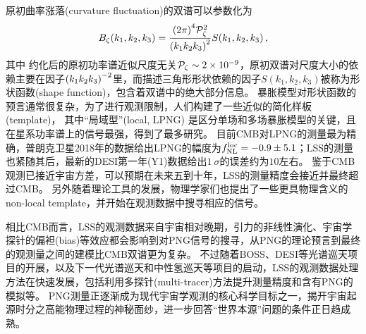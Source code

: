 原初曲率涨落(curvature fluctuation)的双谱可以参数化为
\begin{equation}
    B_{\zeta}(k_1,k_2,k_3) = \frac{{(2\pi)}^4 \mathcal{P}_{\zeta}^2}{{\qty(k_1 k_2 k_3)}^2}  S(k_1,k_2,k_3)\,,
\end{equation}
其中
约化后的原初功率谱近似尺度无关$\mathcal{P}_{\zeta}\sim 2\times 10^{-9}$，原初双谱对尺度大小的依赖主要在因子${\qty(k_1 k_2 k_3)}^{-2}$里，而描述三角形形状依赖的因子$S(k_1,k_2,k_3)$被称为形状函数(shape function)，包含着双谱中的绝大部分信息。
暴胀模型对形状函数的预言通常很复杂，为了进行观测限制，人们构建了一些近似的简化样板(template)，%
其中“局域型”(local, LPNG)%
是区分单场和多场暴胀模型的关键，且在星系功率谱上的信号最强，得到了最多研究\cite{dalal2008bk,ross2013bosspng,putter2017bk,karagiannis2018png,ferraro2019spec,planck2020png,cagliari2023ebosspng,chaussidon2024desipng}。
目前CMB对LPNG的测量最为精确，普朗克卫星2018年的数据给出LPNG的幅度为$f_{\rm NL}^{\rm loc}=-0.9\pm 5.1$\cite{planck2020png}；LSS的测量也紧随其后，最新的DESI第一年(Y1)数据给出$1~\sigma$的误差约为$10$左右\cite{chaussidon2024desipng}。
鉴于CMB观测已接近宇宙方差\cite{babich2004pbscmb,sefusatti2007pngb2}，可以预期在未来五到十年，LSS的测量精度会接近并最终超过CMB\cite{achucarro2022inflation,zhao2024must}。
另外随着理论工具的发展，物理学家们也提出了一些更具物理含义的non-local template，并开始在观测数据中搜寻相应的信号\cite{sohn2024CCCMB,cabass2024boss,green2024boss}。

相比CMB而言，LSS的观测数据来自宇宙相对晚期，引力的非线性演化、宇宙学探针的偏袒(bias)等效应都会影响到对PNG信号的搜寻，从PNG的理论预言到最终的观测量之间的建模比CMB双谱更为复杂。
不过随着BOSS、DESI等光谱巡天项目的开展，以及下一代光谱巡天和中性氢巡天等项目的启动，LSS的观测数据处理方法在快速发展，包括利用多探针(multi-tracer)方法提升测量精度\cite{barreira2023mtpng,sullivan2023mtpng}和含有PNG的模拟\cite{coulton2022quijotepng,adame2024unitpng,hadzhiyska2024abacuspng}等。
PNG测量正逐渐成为现代宇宙学观测的核心科学目标之一，揭开宇宙起源时分之高能物理过程的神秘面纱，进一步回答“世界本源”问题的条件正日趋成熟。


